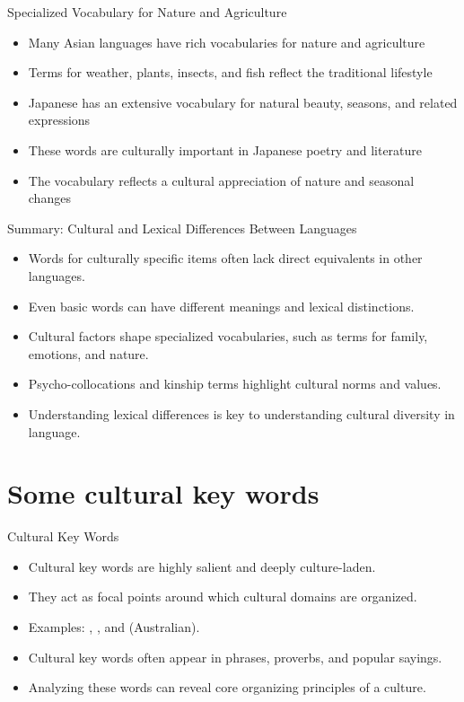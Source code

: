 \documentclass{beamer}
\begin{document}
\begin{frame}{Specialized Vocabulary for Nature and Agriculture}
    \begin{itemize}
        \item Many Asian languages have rich vocabularies for nature and agriculture
        \item Terms for weather, plants, insects, and fish reflect the traditional lifestyle
        \item Japanese has an extensive vocabulary for natural beauty, seasons, and related expressions
        \item These words are culturally important in Japanese poetry and literature
        \item The vocabulary reflects a cultural appreciation of nature and seasonal changes
    \end{itemize}
\end{frame}

\begin{frame}{Summary: Cultural and Lexical Differences Between Languages}
    \begin{itemize}
        \item Words for culturally specific items often lack direct equivalents in other languages.
        \item Even basic words can have different meanings and lexical distinctions.
        \item Cultural factors shape specialized vocabularies, such as terms for family, emotions, and nature.
        \item Psycho-collocations and kinship terms highlight cultural norms and values.
        \item Understanding lexical differences is key to understanding cultural diversity in language.
    \end{itemize}
\end{frame}


\section{Some cultural key words}

\begin{frame}{Cultural Key Words}
    \begin{itemize}
        \item Cultural key words are highly salient and deeply culture-laden.
        \item They act as focal points around which cultural domains are organized.
        \item Examples: , , and  (Australian).
        \item Cultural key words often appear in phrases, proverbs, and popular sayings.
        \item Analyzing these words can reveal core organizing principles of a culture.
    \end{itemize}
\end{frame}
\end{document}
